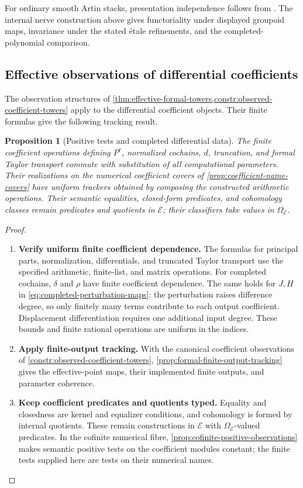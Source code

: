 \documentclass[11pt,a4paper]{article}
\numberwithin{algorithm}{section}
\numberwithin{equation}{section}
\newtheorem{proposition}[proposition]{Proposition}
\theoremstyle{definition}
\theoremstyle{remark}
\theoremstyle{plain}
\newcommand{\E}{\mathcal E}
\newcommand{\Truth}{\Omega_{\E}}
\theoremstyle{definition}
\theoremstyle{plain}
\begin{document}
For ordinary smooth Artin stacks, presentation independence follows
from \citet{BehrendDR}. The internal nerve construction above gives
functoriality under displayed groupoid maps, invariance under the
stated \'etale refinements, and the completed-polynomial comparison.

\subsection{Effective observations of differential coefficients}
\label{sec:derham-effectivity}
The observation structures of
\cref{thm:effective-formal-towers,constr:observed-coefficient-towers}
apply to the differential coefficient objects. Their finite formulas
give the following tracking result.

\begin{proposition}[Positive tests and completed differential data]
\label{prop:derham-positive-tests}
The finite coefficient operations defining $P^r$, normalized
cochains, $d$, truncation, and formal Taylor transport commute
with substitution of all computational parameters.  Their
realizations on the numerical coefficient covers of
\cref{prop:coefficient-name-covers} have uniform trackers obtained
by composing the constructed arithmetic operations.  Their semantic equalities, closed-form predicates,
and cohomology classes remain predicates and quotients in $\E$;
their classifiers take values in $\Truth$.
\end{proposition}
\begin{proof}\leavevmode
\begin{enumerate}[leftmargin=*,align=left]
\item \textbf{Verify uniform finite coefficient dependence.}
The formulas for principal parts, normalization, differentials,
and truncated Taylor transport use the specified arithmetic,
finite-list, and matrix operations. For completed cochains,
$\delta$ and $\rho$ have finite coefficient dependence.
The same holds for $J,H$ in \eqref{eq:completed-perturbation-maps}:
the perturbation raises difference degree, so only finitely many
terms contribute to each output coefficient. Displacement
differentiation requires one additional input degree.
These bounds and finite rational operations are uniform in the indices.

\item \textbf{Apply finite-output tracking.}
With the canonical coefficient observations of
\cref{constr:observed-coefficient-towers},
\cref{prop:formal-finite-output-tracking} gives the effective-point
maps, their implemented finite outputs, and parameter coherence.

\item \textbf{Keep coefficient predicates and quotients typed.}
Equality and closedness are kernel and equalizer conditions, and
cohomology is formed by internal quotients. These remain constructions
in $\E$ with $\Truth$-valued predicates. In the cofinite numerical
fibre, \cref{prop:cofinite-positive-observations} makes semantic
positive tests on the coefficient modules constant; the finite
tests supplied here are tests on their numerical names.
\end{enumerate}
\end{proof}
\end{document}
